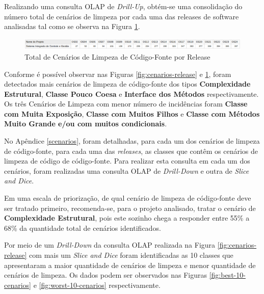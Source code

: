 Realizando uma consulta OLAP de \textit{Drill-Up}, obtém-se uma consolidação do número total de cenários de limpeza por cada uma das releases de software analisadas tal como se observa na Figura \ref{fig:cenarios-total}.

\begin{figure}[ht!]
\centering
\includegraphics[keepaspectratio=true,scale=0.48]{figuras/total-cenarios-release.eps}
\caption{Total de Cenários de Limpeza de Código-Fonte por Release}
\label{fig:cenarios-total}
\end{figure}
\FloatBarrier

Conforme é possível observar nas Figuras \ref{fig:cenarios-release} e \ref{fig:cenarios-total}, foram detectados mais cenários de limpeza de código-fonte dos tipos \textbf{Complexidade Estrutural}, \textbf{Classe Pouco Coesa} e \textbf{Interface dos Métodos} respectivamente. Os três Cenários de Limpeza com menor número de incidências foram \textbf{Classe com Muita Exposição}, \textbf{Classe com Muitos Filhos} e \textbf{Classe com Métodos Muito Grande e/ou com muitos condicionais}.

No Apêndice \ref{scenarios}, foram detalhadas, para cada um dos cenários de limpeza de código-fonte, para cada uma das \textit{releases}, as classes que contêm os cenários de limpeza de código de código-fonte. Para realizar esta consulta em cada um dos cenários, foram realizadas uma consulta OLAP de \textit{Drill-Down} e outra de \textit{Slice and Dice}.

Em uma escala de priorização, de qual cenário de limpeza de código-fonte deve ser tratado primeiro, recomenda-se, para o projeto analisado, tratar o cenário de \textbf{Complexidade Estrutural}, pois este sozinho chega a responder entre 55\% a 68\% da quantidade total de cenários identificados. 

Por meio de um \textit{Drill-Down} da consulta OLAP realizada na Figura \ref{fig:cenarios-release} com mais um \textit{Slice and Dice} foram identificadas as 10 classes que apresentaram a maior quantidade de cenários de limpeza e menor quantidade de cenários de limpeza. Os dados podem ser observados nas Figuras \ref{fig:best-10-cenarios} e \ref{fig:worst-10-cenarios} respectivamente.

